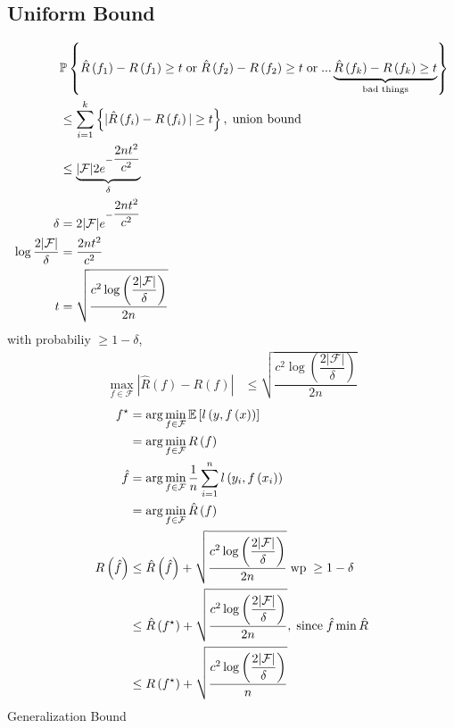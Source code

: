 \documentclass{article}
\begin{document}
\subsection{Uniform Bound}
\begin{align*}
&\mathbb{P}\left\{ \hat{R}\left(f_{1}\right) - R\left(f_{1}\right) \geq  t \text{\;or\;} \hat{R}\left(f_{2}\right) - R\left(f_{2}\right) \geq  t \text{\;or\;} ... \underbrace{\hat{R}\left(f_{k}\right) - R\left(f_{k}\right) \geq  t}_{\text{\;bad things\;}}\right\}
\\ &\leq  \displaystyle\sum_{i=1}^{k} \left\{ | \hat{R}\left(f_{i}\right) - R\left(f_{i}\right) | \geq  t \right\}, \text{\;union bound\;}
\\ &\leq  \underbrace{| \mathcal{F} | 2 e^{- \dfrac{2 n t^{2}}{c^{2}}}}_{\delta}
\\ \delta &= 2 | \mathcal{F} | e^{- \dfrac{2 n t^{2}}{c^{2}}}
\\ \log \dfrac{2 \mathcal{|F}|}{\delta} &= \dfrac{2 n t^{2}}{c^{2}}
\\ t  &= \sqrt{\dfrac{c^{2} \log\left(\dfrac{2 \mathcal{|F}|}{\delta}\right)}{2 n}}
\end{align*}
with probabiliy $\geq  1 - \delta$,
\begin{align*}
\displaystyle\max_{f \in \mathcal{F}} | \hat{R}\left(f\right) - R\left(f\right) | &\leq  \sqrt{\dfrac{c^{2} \log\left(\dfrac{2 \mathcal{|F}|}{\delta}\right)}{2 n}}
\end{align*}
\begin{align*}
f^\star  &= \arg\displaystyle\min_{f \in \mathcal{F}} \mathbb{E}\left[l\left(y, f\left(x\right)\right)\right]
\\ &= \arg\displaystyle\min_{f \in \mathcal{F}} R\left(f\right) 
\\ \hat{f} &= \arg\displaystyle\min_{f \in \mathcal{F}} \dfrac{1}{n} \displaystyle\sum_{i=1}^{n} l\left(y_{i}, f\left(x_{i}\right)\right)
\\ &= \arg\displaystyle\min_{f \in \mathcal{F}} \hat{R}\left(f\right)
\\ R\left(\hat{f}\right)  &\leq  \hat{R}\left(\hat{f}\right) + \sqrt{\dfrac{c^{2} \log\left(\dfrac{2 \mathcal{|F}|}{\delta}\right)}{2 n}} \text{\;wp\;} \geq  1 - \delta
\\ &\leq  \hat{R}\left(f^\star \right) + \sqrt{\dfrac{c^{2} \log\left(\dfrac{2 \mathcal{|F}|}{\delta}\right)}{2 n}}, \text{\;since\;} \hat{f} \displaystyle\min \hat{R}
\\ &\leq  R\left(f^\star \right) + \sqrt{\dfrac{c^{2} \log\left(\dfrac{2 \mathcal{|F}|}{\delta}\right)}{n}}
\end{align*}
Generalization Bound
\end{document}

